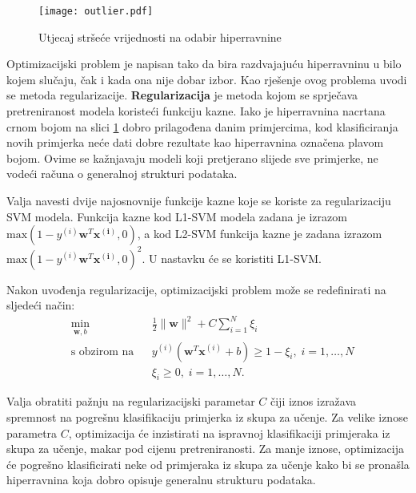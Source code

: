\documentclass[times, utf8, zavrsni, numeric]{fer}
\begin{document}
\begin{figure}
\centering
\texttt{[image: outlier.pdf]}
\caption{Utjecaj stršeće vrijednosti na odabir hiperravnine}
\label{fig:outlier}
\end{figure}

\par Optimizacijski problem je napisan tako da bira razdvajajuću hiperravninu u bilo kojem slučaju, čak i kada
ona nije dobar izbor. Kao rješenje ovog problema uvodi se metoda regularizacije.
\textbf{Regularizacija} je metoda kojom se sprječava pretreniranost modela koristeći funkciju kazne.
Iako je hiperravnina nacrtana crnom bojom na slici \ref{fig:outlier} dobro prilagođena danim primjercima,
kod klasificiranja novih primjerka neće dati dobre rezultate kao hiperravnina označena plavom bojom.
Ovime se kažnjavaju modeli koji pretjerano slijede sve primjerke, ne vodeći računa o generalnoj strukturi 
podataka.

\par Valja navesti dvije najosnovnije funkcije kazne koje se koriste za regularizaciju SVM modela.
Funkcija kazne kod L1-SVM modela zadana je izrazom $\text{max}(1 - y^{(i)}\mathbf{w}^T\mathbf{x^{(i)}}, 0)$, a
kod L2-SVM funkcija kazne je zadana izrazom $\text{max}(1 - y^{(i)}\mathbf{w}^T\mathbf{x^{(i)}}, 0)^2$.
U nastavku će se koristiti L1-SVM.

\par Nakon uvođenja regularizacije, optimizacijski problem može se redefinirati na sljedeći način:
\begin{equation}
\begin{aligned}
& \underset{\mathbf{w}, b}{\text{min}}
& & \frac{1}{2}\|\mathbf{w}\|^2 + C\sum_{i=1}^{N} \xi_i\\
& \text{s obzirom na}
& & y^{(i)}(\mathbf{w}^T\mathbf{x}^{(i)} + b) \geq 1 - \xi_i, \; i = 1, \ldots, N \\
&&& \xi_i \geq 0, \; i = 1, \ldots, N.
\end{aligned}
\label{eq:opt}
\end{equation}

Valja obratiti pažnju na regularizacijski parametar $C$ čiji iznos izražava spremnost na pogrešnu klasifikaciju
primjerka iz skupa za učenje.
Za velike iznose parametra $C$, optimizacija će inzistirati na ispravnoj klasifikaciji primjeraka iz skupa
za učenje, makar pod cijenu pretreniranosti. Za manje iznose, optimizacija će pogrešno klasificirati 
neke od primjeraka iz skupa za učenje kako bi se pronašla hiperravnina koja dobro opisuje generalnu strukturu
podataka.
\end{document}
